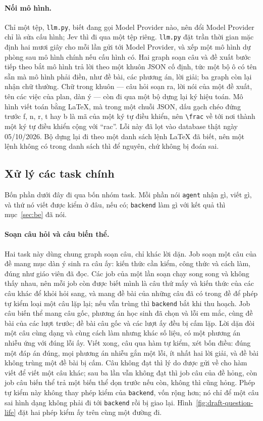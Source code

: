 \paragraph{Nối mô hình.} Chỉ một tệp, \texttt{llm.py}, biết đang gọi Model Provider nào, nên đổi
Model Provider chỉ là sửa cấu hình; Jev thì đi qua một tệp riêng. \texttt{llm.py} đặt trần thời gian
mặc định hai mươi giây cho mỗi lần gửi tới Model Provider, và xếp một mô hình dự phòng sau mô hình
chính nếu cấu hình có. Hai graph soạn câu và đề xuất bước tiếp theo bắt mô hình trả lời theo một
khuôn JSON cố định, tức một bộ ô có tên sẵn mà mô hình phải điền, như đề bài, các phương án, lời
giải; ba graph còn lại nhận chữ thường. Chữ trong khuôn --- câu hỏi soạn ra, lời nói của một đề
xuất, tên các việc của plan, dàn ý --- còn đi qua một bộ dựng lại ký hiệu toán. Mô hình viết toán
bằng LaTeX, mà trong một chuỗi JSON, dấu gạch chéo đứng trước f, n, r, t hay b là mã của một ký tự
điều khiển, nên \texttt{\textbackslash frac} về tới nơi thành một ký tự điều khiển cộng với ``rac''.
Lỗi này đã lọt vào database thật ngày 05/10/2026. Bộ dựng lại đi theo một danh sách lệnh LaTeX đã
biết, nên một lệnh không có trong danh sách thì để nguyên, chứ không bị đoán sai.

\subsection{Xử lý các task chính}

Bốn phần dưới đây đi qua bốn nhóm task. Mỗi phần nói \texttt{agent} nhận gì, viết gì, và thứ nó viết
được kiểm ở đâu, nếu có; \texttt{backend} làm gì với kết quả thì mục~\ref{sec:be} đã nói.

\paragraph{Soạn câu hỏi và câu biến thể.} Hai task này dùng chung graph soạn câu, chỉ khác lời dặn.
Job soạn một câu của đề mang mục dàn ý sinh ra câu ấy: kiến thức cần kiểm, công thức và cách làm,
đúng như giáo viên đã đọc. Các job của một lần soạn chạy song song và không thấy nhau, nên mỗi job
còn được biết mình là câu thứ mấy và kiến thức của các câu khác để khỏi hỏi sang, và mang đề bài của
những câu đã có trong đề để phép tự kiểm loại một câu lặp lại; nếu vẫn trùng thì \texttt{backend}
bắt khi thu hoạch. Job câu biến thể mang câu gốc, phương án học sinh đã chọn và lỗi em mắc, cùng đề
bài của các lượt trước; đề bài câu gốc và các lượt ấy đều bị cấm lặp. Lời dặn đòi một câu cùng dạng
và cùng cách làm nhưng khác số liệu, có một phương án nhiễu ứng với đúng lỗi ấy. Viết xong, câu qua
hàm tự kiểm, xét bốn điều: đúng một đáp án đúng, mọi phương án nhiễu gắn một lỗi, ít nhất hai lời
giải, và đề bài không trùng một đề bài bị cấm. Câu không đạt thì lý do được gửi về cho hàm viết để
viết một câu khác; sau ba lần vẫn không đạt thì job câu của đề hỏng, còn job câu biến thể trả một biến thể dọn trước
nếu còn, không thì cũng hỏng. Phép tự kiểm
này không thay phép kiểm của \texttt{backend}, vốn rộng hơn; nó chỉ để một câu sai hình dạng không
phải đi tới \texttt{backend} rồi bị giao lại.
Hình~\ref{fig:draft-question-life} đặt hai phép kiểm ấy trên cùng một đường đi.

